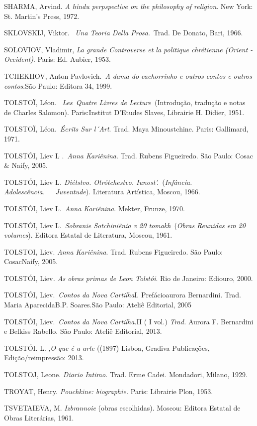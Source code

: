 SHARMA, Arvind. \emph{A hindu perpspective on the philosophy of
religion}. New York: St. Martin's Press, 1972.

SKLOVSKIJ, Viktor. ~\emph{Una Teoria Della Prosa}.~Trad. De Donato,
Bari, 1966.

SOLOVIOV, Vladimir, \emph{La grande Controverse et la politique
chrétienne (Orient -Occident)}. Paris: Ed. Aubier, 1953.

TCHEKHOV, Anton Pavlovich.~\emph{A dama do cachorrinho e outros contos e
outros contos}.São Paulo: Editora 34, 1999.

TOLSTOÏ, Léon. ~\emph{Les}~\emph{Quatre Livres de Lecture~}(Introdução,
tradução e notas de Charles Salomon). Paris:Institut D'Etudes Slaves,
Librairie H. Didier, 1951.

TOLSTOÏ, Léon.~\emph{Écrits Sur l´Art}. Trad. Maya Minoustchine. Paris:
Gallimard, 1971.

TOLSTÓI, Liev L .~\emph{Anna Kariênina}. Trad. Rubens Figueiredo. São
Paulo: Cosac \& Naify, 2005.

TOLSTÓI, Liev L\emph{. Diétstvo. Otrótchestvo.
Iunost'.}~(\emph{Infância. Adolescência.~~~Juventude}). Literatura
Artística, Moscou, 1966.

TOLSTÓI, Liev L.~\emph{Anna Kariênina}. Mekter, Frunze, 1970.

TOLSTÓI, Liev L.~\emph{Sobranie Sotchiniênia v 20 tomakh}~(\emph{Obras
Reunidas em 20 volumes}). Editora Estatal de Literatura, Moscou, 1961.

TOLSTOI, Liev. \emph{Anna Kariênina}. Trad. Rubens Figueiredo. São
Paulo: CosacNaify, 2005.

TOLSTÓI, Liev\emph{. As obras primas de Leon Tolstói}. Rio de Janeiro:
Ediouro, 2000.

TOLSTÓI, Liev.~\emph{Contos da Nova Cartilha}I. Prefácioaurora
Bernardini. Trad. Maria AparecidaB.P. Soares.São Paulo: Ateliê
Editorial, 2005

TOLSTÓI, Liev.~\emph{Contos da Nova Cartilha.}II ( I vol.) \emph{Trad.}
Aurora F. Bernardini e Belkiss Rabello. São Paulo: Ateliê Editorial,
2013.

TOLSTÓI. L. ,\emph{O que é a arte} ((1897) Lisboa, Gradiva Publicações,
Edição/reimpressão: 2013.

TOLSTOJ, Leone. \emph{Diario Intimo.} Trad. Erme Cadei. Mondadori,
Milano, 1929.

TROYAT, Henry. \emph{Pouchkine: biographie.} Paris: Librairie Plon,
1953.

TSVETAIEVA, M. \emph{Izbrannoie} (obras escolhidas). Moscou: Editora
Estatal de Obras Literárias, 1961.

